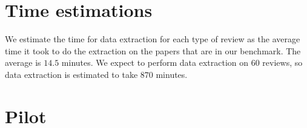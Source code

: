 \documentclass{article}
\begin{document}
\section{Time estimations}

We estimate the time for data extraction for each type of review as the average time it took to do the extraction on the papers that are in our benchmark. The average is $14.5$ minutes. We expect to perform data extraction on 60 reviews, so data extraction is estimated to take $870$ minutes.

\section{Pilot}
\end{document}
